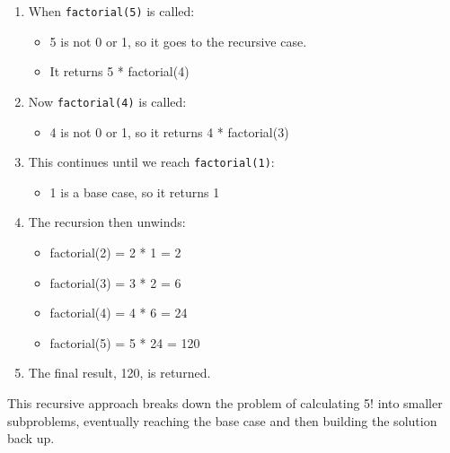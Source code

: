 \begin{enumerate}
\def\labelenumi{\arabic{enumi}.}
\tightlist
\item
  When \texttt{factorial(5)} is called:

  \begin{itemize}
  \tightlist
  \item
    5 is not 0 or 1, so it goes to the recursive case.
  \item
    It returns 5 * factorial(4)
  \end{itemize}
\item
  Now \texttt{factorial(4)} is called:

  \begin{itemize}
  \tightlist
  \item
    4 is not 0 or 1, so it returns 4 * factorial(3)
  \end{itemize}
\item
  This continues until we reach \texttt{factorial(1)}:

  \begin{itemize}
  \tightlist
  \item
    1 is a base case, so it returns 1
  \end{itemize}
\item
  The recursion then unwinds:

  \begin{itemize}
  \tightlist
  \item
    factorial(2) = 2 * 1 = 2
  \item
    factorial(3) = 3 * 2 = 6
  \item
    factorial(4) = 4 * 6 = 24
  \item
    factorial(5) = 5 * 24 = 120
  \end{itemize}
\item
  The final result, 120, is returned.
\end{enumerate}

This recursive approach breaks down the problem of calculating 5! into
smaller subproblems, eventually reaching the base case and then building
the solution back up.

\begin{Shaded}
\begin{Highlighting}[]
\end{Highlighting}
\end{Shaded}

